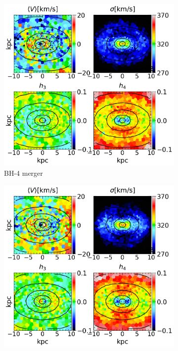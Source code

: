 \documentclass[english, oneside]{HYgradu}
\begin{document}
\begin{figure}
	\centering
	\begin{subfigure}[b]{0.49\textwidth}
		\includegraphics[width=\textwidth]{BH_4.png}
		\caption{BH-4 merger}
	\end{subfigure}
	\begin{subfigure}[b]{0.49\textwidth}
		\includegraphics[width=\textwidth]{BH_5.png}

\end{subfigure}
\end{figure}
\end{document}
